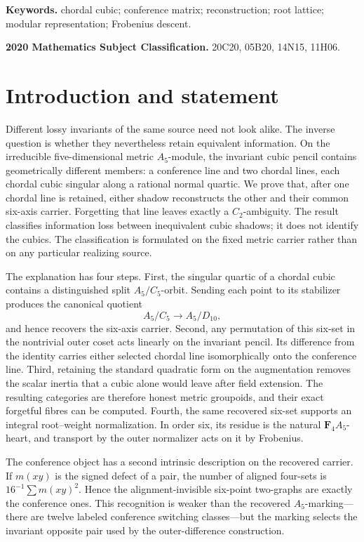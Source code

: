 \documentclass[11pt]{article}
\theoremstyle{definition}
\theoremstyle{remark}
\newcommand{\F}{\mathbf F}
\begin{document}
\noindent\textbf{Keywords.} chordal cubic; conference matrix; reconstruction;
root lattice; modular representation; Frobenius descent.

\smallskip
\noindent\textbf{2020 Mathematics Subject Classification.} 20C20, 05B20,
14N15, 11H06.

\section{Introduction and statement}
\label{sec:introduction}

Different lossy invariants of the same source need not look alike.  The
inverse question is whether they nevertheless retain equivalent information.
On the irreducible five-dimensional metric \(A_5\)-module, the invariant
cubic pencil contains geometrically different members: a conference line and
two chordal lines, each chordal cubic singular along a rational normal
quartic.  We prove that, after one chordal line is retained, either shadow
reconstructs the other and their common six-axis carrier.  Forgetting that
line leaves exactly a \(C_2\)-ambiguity.  The result classifies information
loss between inequivalent cubic shadows; it does not identify the cubics.
The classification is formulated on the fixed metric carrier rather than on
any particular realizing source.

The explanation has four steps.  First, the singular quartic of a chordal
cubic contains a distinguished split \(A_5/C_5\)-orbit.  Sending each point
to its stabilizer produces the canonical quotient
\[
              A_5/C_5\longrightarrow A_5/D_{10},
\]
and hence recovers the six-axis carrier.  Second, any permutation of this six-set in the
nontrivial outer coset acts linearly on the invariant pencil.  Its
difference from the identity carries either selected chordal line
isomorphically onto the conference line.  Third, retaining the standard
quadratic form on the augmentation removes the scalar inertia that a cubic
alone would leave after field extension.  The resulting categories are
therefore honest metric groupoids, and their exact forgetful fibres can be
computed.  Fourth, the same recovered six-set supports an integral
root--weight normalization.  In order six, its residue is the natural
\(\F_4A_5\)-heart, and transport by the outer normalizer acts on it by Frobenius.

The conference object has a second intrinsic description on the recovered
carrier.  If \(m(xy)\) is the signed defect of a pair, the number of aligned
four-sets is \(16^{-1}\sum m(xy)^2\).  Hence the alignment-invisible
six-point two-graphs are exactly the conference ones.  This recognition is
weaker than the recovered \(A_5\)-marking---there are twelve labeled
conference switching classes---but the marking selects the invariant opposite
pair used by the outer-difference construction.
\end{document}
